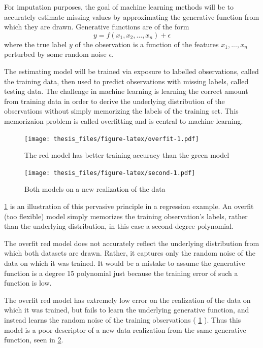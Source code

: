 \documentclass[12pt,twoside]{reedthesis}
\begin{document}
For imputation purposes, the goal of machine learning methods will be to
accurately estimate missing values by approximating the generative
function from which they are drawn. Generative functions are of the form
\[
y = f(x_1, x_2, \dots, x_n) + \epsilon
\] where the true label \(y\) of the observation is a function of the
features \(x_1, ..., x_n\) perturbed by some random noise \(\epsilon\).

The estimating model will be trained via exposure to labelled
observations, called the training data, then used to predict
observations with missing labels, called testing data. The challenge in
machine learning is learning the correct amount from training data in
order to derive the underlying distribution of the observations without
simply memorizing the labels of the training set. This memorizaion
problem is called overfitting and is central to machine learning.
\begin{figure}
\centering
\texttt{[image: thesis\_files/figure-latex/overfit-1.pdf]}
\caption{\label{fig:overfit}The red model has better training accuracy than
the green model}
\end{figure}
\begin{figure}
\centering
\texttt{[image: thesis\_files/figure-latex/second-1.pdf]}
\caption{\label{fig:second}Both models on a new realization of the data}
\end{figure}
\ref{fig:overfit} is an illustration of this pervasive principle in a
regression example. An overfit (too flexible) model simply memorizes the
training observation's labels, rather than the underlying distribution,
in this case a second-degree polynomial.

The overfit red model does not accurately reflect the underlying
distribution from which both datasets are drawn. Rather, it captures
only the random noise of the data on which it was trained. It would be a
mistake to assume the generative function is a degree 15 polynomial just
because the training error of such a function is low.

The overfit red model has extremely low error on the realization of the
data on which it was trained, but fails to learn the underlying
generative function, and instead learns the random noise of the training
observations ( \ref{fig:overfit} ). Thus this model is a poor descriptor
of a new data realization from the same generative function, seen in
\ref{fig:second}.
\end{document}
